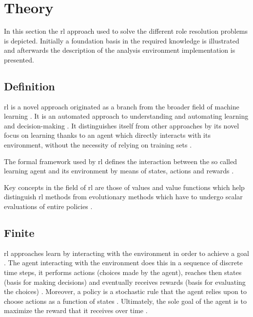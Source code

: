 \documentclass{seal_thesis}
\begin{document}
\section{ Theory}
\label{sec:rl_theory}

In this section the \gls{rl} approach used to solve the different role resolution problems is depicted. Initially a foundation basis in the required knowledge is illustrated and afterwards the description of the analysis environment implementation is presented.

\subsection{ Definition}

\gls{rl} is a novel approach originated as a branch from the broader field of machine learning \cite{Sutton2017}. It is an automated approach to understanding and automating learning and decision-making \cite[p. 15]{Sutton2017}. It distinguishes itself from other approaches by its novel focus on learning thanks to an agent which directly interacts with its environment, without the necessity of relying on training sets \cite[p. 15]{Sutton2017}.

The formal framework used by \gls{rl} defines the interaction between the so called learning agent and its environment by means of states, actions and rewards \cite[p. 15]{Sutton2017}.

Key concepts in the field of \gls{rl} are those of values and value functions which help distinguish \gls{rl} methods from evolutionary methods which have to undergo scalar evaluations of entire policies \cite[p. 15]{Sutton2017}.

\subsection{Finite }

\gls{rl} approaches learn by interacting with the environment in order to achieve a goal \cite{Sutton2017}. The agent interacting with the environment does this in a sequence of discrete time steps, it performs actions (choices made by the agent), reaches then states (basis for making decisions) and eventually receives rewards (basis for evaluating the choices) \cite[p. 73]{Sutton2017}. Moreover, a policy is a stochastic rule that the agent relies upon to choose actions as a function of states \cite[p. 73]{Sutton2017}. Ultimately, the sole goal of the agent is to maximize the reward that it receives over time \cite[p. 73]{Sutton2017}.
\end{document}
